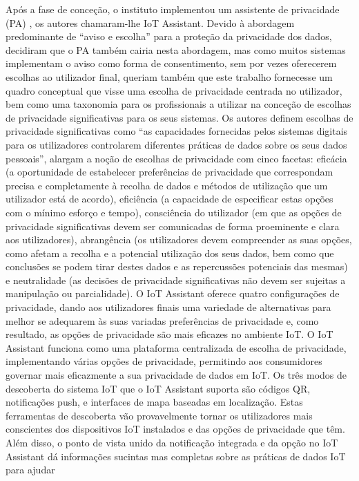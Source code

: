 \documentclass[conference]{IEEEtran}
\begin{document}
Após a fase de conceção, o instituto implementou um assistente de privacidade
(PA) \cite{FengDesign}, os autores chamaram-lhe IoT Assistant. Devido à
abordagem predominante de ``aviso e escolha'' para a proteção da privacidade
dos dados, decidiram que o PA também cairia nesta abordagem, mas como muitos
sistemas implementam o aviso como forma de consentimento, sem por vezes
oferecerem escolhas ao utilizador final, queriam também que este trabalho
fornecesse um quadro conceptual que visse uma escolha de privacidade centrada
no utilizador, bem como uma taxonomia para os profissionais a utilizar na
conceção de escolhas de privacidade significativas para os seus sistemas.
Os autores definem escolhas de privacidade significativas como ``as capacidades
fornecidas pelos sistemas digitais para os utilizadores controlarem diferentes
práticas de dados sobre os seus dados pessoais'', alargam a noção de escolhas
de privacidade com cinco facetas: eficácia (a oportunidade de estabelecer
preferências de privacidade que correspondam precisa e completamente à recolha
de dados e métodos de utilização que um utilizador está de acordo), eficiência
(a capacidade de especificar estas opções com o mínimo esforço e tempo),
consciência do utilizador (em que as opções de privacidade significativas devem
ser comunicadas de forma proeminente e clara aos utilizadores), abrangência (os
utilizadores devem compreender as suas opções, como afetam a recolha e a
potencial utilização dos seus dados, bem como que conclusões se podem tirar
destes dados e as repercussões potenciais das mesmas) e neutralidade (as decisões
de privacidade significativas não devem ser sujeitas a manipulação ou parcialidade).
O IoT Assistant oferece quatro configurações de privacidade, dando aos
utilizadores finais uma variedade de alternativas para melhor se adequarem
às suas variadas preferências de privacidade e, como resultado, as opções
de privacidade são mais eficazes no ambiente IoT. O IoT Assistant funciona
como uma plataforma centralizada de escolha de privacidade, implementando
várias opções de privacidade, permitindo aos consumidores governar mais
eficazmente a sua privacidade de dados em IoT. Os três modos de descoberta
do sistema IoT que o IoT Assistant suporta são códigos QR, notificações
push, e interfaces de mapa baseadas em localização. Estas ferramentas de
descoberta vão provavelmente tornar os utilizadores mais conscientes dos
dispositivos IoT instalados e das opções de privacidade que têm. Além disso,
o ponto de vista unido da notificação integrada e da opção no IoT Assistant
dá informações sucintas mas completas sobre as práticas de dados IoT para ajudar
\end{document}
